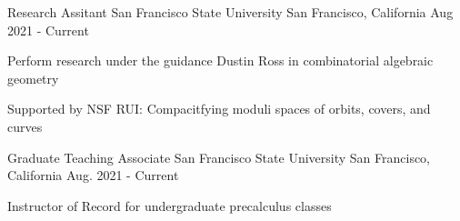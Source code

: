 \documentclass[../omelveny-cv]{subfiles}
\begin{document}


\begin{cventries}

    \cventry
    {Research Assitant}
    {San Francisco State University}
    {San Francisco, California}
    {Aug 2021 - Current}
    {
        \begin{cvitems}
            \item {Perform research under the guidance Dustin Ross in combinatorial algebraic geometry }
            \item {Supported by NSF RUI: Compacitfying moduli spaces of orbits, covers, and curves}
        \end{cvitems}
    }

    \cventry
    {Graduate Teaching Associate}
    {San Francisco State University}
    {San Francisco, California}
    {Aug. 2021 - Current}
    {
        \begin{cvitems}
            \item {Instructor of Record for undergraduate precalculus classes}
        \end{cvitems}
    }


\end{cventries}
\end{document}
